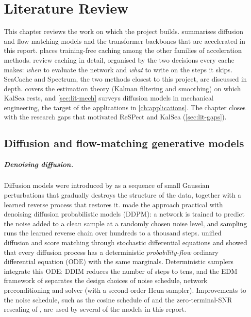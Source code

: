 \chapter{Literature Review}\label{ch:literature}

This chapter reviews the work on which the project builds.  summarises diffusion and flow-matching models and the transformer backbones that are accelerated in this report.  places training-free caching among the other families of acceleration methods.  review caching in detail, organised by the two decisions every cache makes: \emph{when} to evaluate the network and \emph{what} to write on the steps it skips. SeaCache and Spectrum, the two methods closest to this project, are discussed in depth.  covers the estimation theory (Kalman filtering and smoothing) on which KalSea rests, and \cref{sec:lit-mech} surveys diffusion models in mechanical engineering, the target of the applications in \cref{ch:applications}. The chapter closes with the research gaps that motivated ReSPect and KalSea (\cref{sec:lit-gaps}).

\section{Diffusion and flow-matching generative models}\label{sec:lit-generative}

\paragraph{Denoising diffusion.} Diffusion models were introduced by \citet{sohl2015deep} as a sequence of small Gaussian perturbations that gradually destroys the structure of the data, together with a learned reverse process that restores it. \citet{ho2020ddpm} made the approach practical with denoising diffusion probabilistic models (DDPM): a network is trained to predict the noise added to a clean sample at a randomly chosen noise level, and sampling runs the learned reverse chain over hundreds to a thousand steps. \citet{song2021sde} unified diffusion and score matching through stochastic differential equations and showed that every diffusion process has a deterministic \emph{probability-flow} ordinary differential equation (ODE) with the same marginals. Deterministic samplers integrate this ODE: DDIM \citep{song2021ddim} reduces the number of steps to tens, and the EDM framework of \citet{karras2022edm} separates the design choices of noise schedule, network preconditioning and solver (with a second-order Heun sampler). Improvements to the noise schedule, such as the cosine schedule of \citet{nichol2021improved} and the zero-terminal-SNR rescaling of \citet{lin2024zerosnr}, are used by several of the models in this report.

